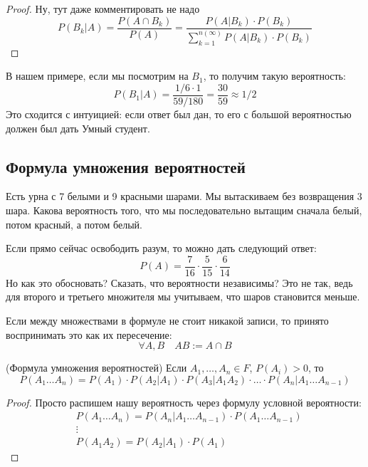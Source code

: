 \begin{proof}
	Ну, тут даже комментировать не надо
	\[
		P(B_k | A) = \frac{P(A \cap B_k)}{P(A)} = \frac{P(A | B_k) \cdot P(B_k)}{\sum_{k = 1}^{n(\infty)} P(A | B_k) \cdot P(B_k)}
	\]
\end{proof}

\begin{example}
	В нашем примере, если мы посмотрим на $B_1$, то получим такую вероятность:
	\[
		P(B_1 | A) = \frac{1 / 6 \cdot 1}{59 / 180} = \frac{30}{59} \approx 1 / 2
	\]
	Это сходится с интуицией: если ответ был дан, то его с большой вероятностью должен был дать Умный студент.
\end{example}

\subsection{Формула умножения вероятностей}

\begin{example}
	Есть урна с 7 белыми и 9 красными шарами. Мы вытаскиваем без возвращения 3 шара. Какова вероятность того, что мы последовательно вытащим сначала белый, потом красный, а потом белый.
	
	Если прямо сейчас освободить разум, то можно дать следующий ответ:
	\[
		P(A) = \frac{7}{16} \cdot \frac{5}{15} \cdot \frac{6}{14}
	\]
	Но как это обосновать? Сказать, что вероятности независимы? Это не так, ведь для второго и третьего множителя мы учитываем, что шаров становится меньше.
\end{example}

\begin{note}
	Если между множествами в формуле не стоит никакой записи, то принято воспринимать это как их пересечение:
	\[
		\forall A, B \quad AB := A \cap B
	\]
\end{note}

\begin{theorem} (Формула умножения вероятностей)
	Если $A_1, \ldots, A_n \in F$, $P(A_i) > 0$, то
	\[
		P(A_1 \ldots A_n) = P(A_1) \cdot P(A_2 | A_1) \cdot P(A_3 | A_1A_2) \cdot \ldots \cdot P(A_n | A_1 \ldots A_{n - 1})
	\]
\end{theorem}

\begin{proof}
	Просто распишем нашу вероятность через формулу условной вероятности:
	\begin{align*}
		&{P(A_1 \ldots A_n) = P(A_n | A_1 \ldots A_{n - 1}) \cdot P(A_1 \ldots A_{n - 1})}
		\\
		&{\vdots}
		\\
		&{P(A_1 A_2) = P(A_2 | A_1) \cdot P(A_1)}
	\end{align*}
\end{proof}

